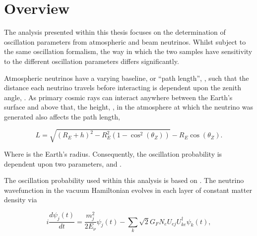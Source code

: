 \section{Overview}
\label{sec:Oscillation_Overview}


The analysis presented within this thesis focuses on the determination of oscillation parameters from atmospheric and beam neutrinos. Whilst subject to the same oscillation formalism, the way in which the two samples have sensitivity to the different oscillation parameters differs  significantly.

Atmospheric neutrinos have a varying baseline, or ``path length'', , such that the distance each neutrino travels before interacting is dependent upon the zenith angle, . As primary cosmic rays can interact anywhere between the Earth's surface and  above that, the height, , in the atmosphere at which the neutrino was generated also affects the path length,

\begin{equation}
  L = \sqrt{\left(R_{E} + h\right)^{2} - R_{E}^{2} \left(1 - \cos^{2} \left(\theta_{Z} \right) \right)} - R_{E}\cos(\theta_{Z}).
\end{equation}

Where  is the Earth's radius. Consequently, the oscillation probability is dependent upon two parameters,  and .

The oscillation probability used within this analysis is based on \cite{Barger:1980tf}. The neutrino wavefunction in the vacuum Hamiltonian evolves in each layer of constant matter density via

\begin{equation}
  i \frac{d\psi_{j}(t)}{dt} = \frac{m_{j}^{2}}{2E_{\nu}} \psi_{j}(t) - \sum_{k} \sqrt{2} G_{F} N_{e} U_{ej} U_{ke}^{\dagger} \psi_{k}(t),
\end{equation}

